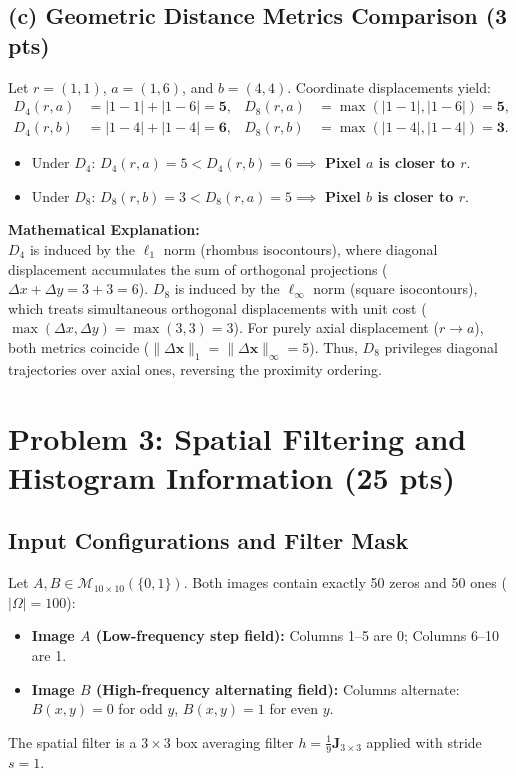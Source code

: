 \documentclass[11pt,a4paper]{article}
\begin{document}
\subsection{(c) Geometric Distance Metrics Comparison (3 pts)}
Let $r = (1, 1)$, $a = (1, 6)$, and $b = (4, 4)$. Coordinate displacements yield:
\begin{align}
D_4(r, a) &= |1 - 1| + |1 - 6| = \mathbf{5}, & D_8(r, a) &= \max(|1 - 1|, |1 - 6|) = \mathbf{5}, \\
D_4(r, b) &= |1 - 4| + |1 - 4| = \mathbf{6}, & D_8(r, b) &= \max(|1 - 4|, |1 - 4|) = \mathbf{3}.
\end{align}
\begin{itemize}
    \item Under $D_4$: $D_4(r, a) = 5 < D_4(r, b) = 6 \implies$ \textbf{Pixel $a$ is closer to $r$}.
    \item Under $D_8$: $D_8(r, b) = 3 < D_8(r, a) = 5 \implies$ \textbf{Pixel $b$ is closer to $r$}.
\end{itemize}
\noindent\textbf{Mathematical Explanation:}\\
$D_4$ is induced by the $\ell_1$ norm (rhombus isocontours), where diagonal displacement accumulates the sum of orthogonal projections ($\Delta x + \Delta y = 3 + 3 = 6$). $D_8$ is induced by the $\ell_\infty$ norm (square isocontours), which treats simultaneous orthogonal displacements with unit cost ($\max(\Delta x, \Delta y) = \max(3, 3) = 3$). For purely axial displacement ($r \to a$), both metrics coincide ($\|\Delta \mathbf{x}\|_1 = \|\Delta \mathbf{x}\|_\infty = 5$). Thus, $D_8$ privileges diagonal trajectories over axial ones, reversing the proximity ordering.

\section{Problem 3: Spatial Filtering and Histogram Information (25 pts)}

\subsection{Input Configurations and Filter Mask}
Let $A, B \in \mathcal{M}_{10 \times 10}(\{0, 1\})$. Both images contain exactly 50 zeros and 50 ones ($|\Omega| = 100$):
\begin{itemize}
    \item \textbf{Image $A$ (Low-frequency step field):} Columns 1--5 are 0; Columns 6--10 are 1.
    \item \textbf{Image $B$ (High-frequency alternating field):} Columns alternate: $B(x, y) = 0$ for odd $y$, $B(x, y) = 1$ for even $y$.
\end{itemize}
The spatial filter is a $3 \times 3$ box averaging filter $h = \frac{1}{9}\mathbf{J}_{3 \times 3}$ applied with stride $s = 1$.
\end{document}

